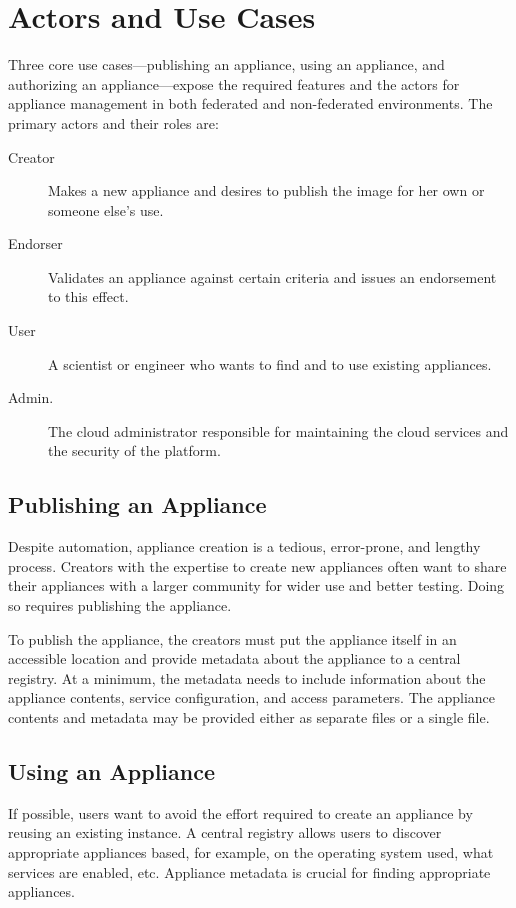 \section{Actors and Use Cases}
\label{sec:use-cases}

Three core use cases---publishing an appliance, using an appliance, and
authorizing an appliance---expose the required features and the actors
for appliance management in both federated and non-federated
environments.  The primary actors and their roles are:
\begin{description}
\item[Creator] Makes a new appliance and desires to publish the image
  for her own or someone else's use.
\item[Endorser] Validates an appliance against certain criteria and
  issues an endorsement to this effect.
\item[User] A scientist or engineer who wants to find and to use
  existing appliances.
\item[Admin.] The cloud administrator responsible for
  maintaining the cloud services and the security of the platform.
\end{description}

\subsection{Publishing an Appliance}

Despite automation, appliance creation is a tedious, error-prone, and
lengthy process.  Creators with the expertise to create new
appliances often want to share their appliances with a larger
community for wider use and better testing.  Doing so requires
publishing the appliance.

To publish the appliance, the creators must put the appliance itself
in an accessible location and provide metadata about the appliance to a
central registry.  At a minimum, the metadata needs to include
information about the appliance contents, service configuration, and
access parameters.  The appliance contents and metadata may be 
provided either as separate files or a single file.

\subsection{Using an Appliance}

If possible, users want to avoid the effort required to create an
appliance by reusing an existing instance.  A central registry allows
users to discover appropriate appliances based, for example, on the
operating system used, what services are enabled, etc.  Appliance
metadata is crucial for finding appropriate appliances.

